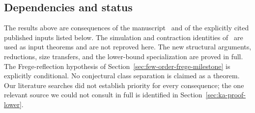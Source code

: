 \documentclass[11pt]{article}
\theoremstyle{definition}
\theoremstyle{remark}
\begin{document}
\subsection{Dependencies and status}

The results above are consequences of the manuscript~\cite{Cruz26} and
of the explicitly cited published inputs listed below. The simulation
and contraction identities of~\cite{Cruz26} are used as input theorems
and are not reproved here. The new structural arguments, reductions,
size transfers, and the lower-bound specialization are proved in full.
The Frege-reflection hypothesis of Section~\ref{sec:few-order-frege-milestone}
is explicitly conditional. No conjectural class separation is claimed
as a theorem. Our literature searches did not establish priority for
every consequence; the one relevant source we could not consult in full
is identified in Section~\ref{sec:ka-proof-lower}.
\end{document}
